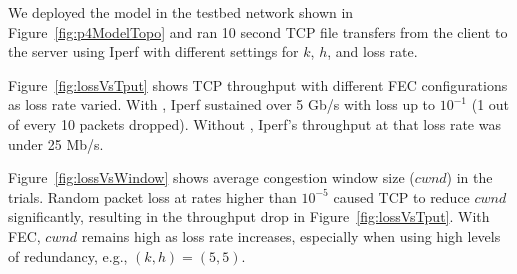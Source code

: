 We deployed the model in the testbed network shown in
Figure~\ref{fig:p4ModelTopo} and ran 10 second TCP file transfers from
the client to the server using Iperf with different settings for $k$, $h$, and
loss rate. 










Figure~\ref{fig:lossVsTput} shows TCP throughput with different FEC
configurations as loss rate varied. With \OurSys, Iperf sustained  over 5 Gb/s
with loss up to $10^{-1}$ (1 out of every 10 packets dropped). Without
\OurSys, Iperf's throughput at that loss rate was under 25 Mb/s. 

Figure~\ref{fig:lossVsWindow} shows average congestion window size ($cwnd$) in the
trials. Random packet loss at rates higher than $10^{-5}$ caused TCP to
reduce $cwnd$ significantly, resulting in the throughput drop in
Figure~\ref{fig:lossVsTput}. With FEC, $cwnd$ remains high as
loss rate increases, especially when using high levels of redundancy, e.g.,
$(k, h) = (5, 5)$.

